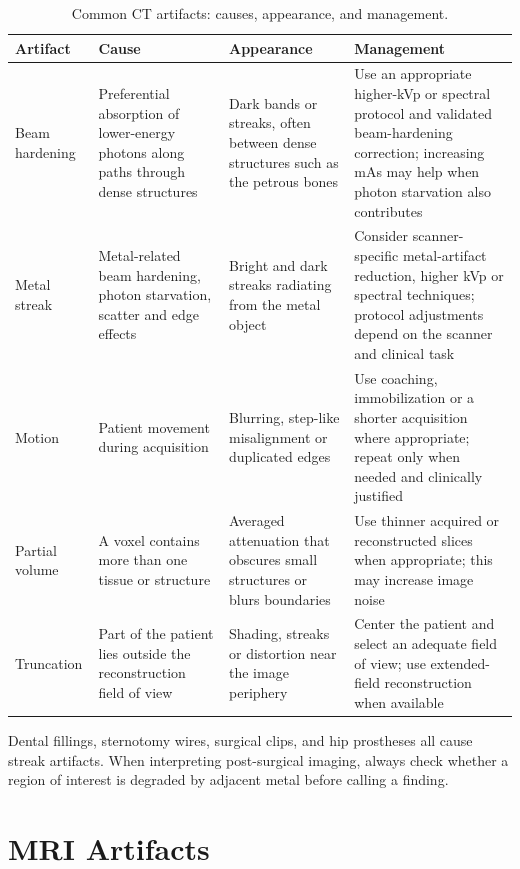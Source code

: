 \begin{table}[h]
\centering
\caption{Common CT artifacts: causes, appearance, and management.}
\label{tab:ct_artifacts}
\begin{tabular}{p{3cm} p{3.5cm} p{3.5cm} p{4cm}}
\toprule
\textbf{Artifact} & \textbf{Cause} & \textbf{Appearance} & \textbf{Management} \\
\midrule
Beam hardening & Preferential absorption of lower-energy photons along paths through dense structures & Dark bands or streaks, often between dense structures such as the petrous bones & Use an appropriate higher-kVp or spectral protocol and validated beam-hardening correction; increasing mAs may help when photon starvation also contributes \\
Metal streak & Metal-related beam hardening, photon starvation, scatter and edge effects & Bright and dark streaks radiating from the metal object & Consider scanner-specific metal-artifact reduction, higher kVp or spectral techniques; protocol adjustments depend on the scanner and clinical task \\
Motion & Patient movement during acquisition & Blurring, step-like misalignment or duplicated edges & Use coaching, immobilization or a shorter acquisition where appropriate; repeat only when needed and clinically justified \\
Partial volume & A voxel contains more than one tissue or structure & Averaged attenuation that obscures small structures or blurs boundaries & Use thinner acquired or reconstructed slices when appropriate; this may increase image noise \\
Truncation & Part of the patient lies outside the reconstruction field of view & Shading, streaks or distortion near the image periphery & Center the patient and select an adequate field of view; use extended-field reconstruction when available \\
\bottomrule
\end{tabular}
\end{table}

\begin{pearlbox}
Dental fillings, sternotomy wires, surgical clips, and hip prostheses all cause streak artifacts. When interpreting post-surgical imaging, always check whether a region of interest is degraded by adjacent metal before calling a finding.
\end{pearlbox}

\section{MRI Artifacts}

